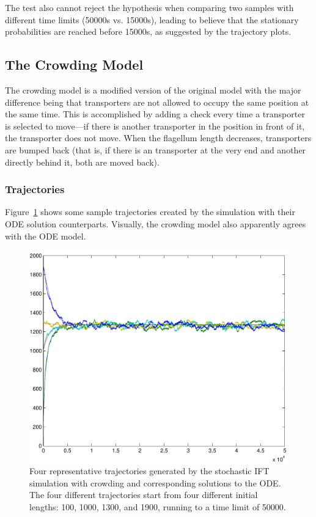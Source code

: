 \documentclass[titlepage]{article}
\begin{document}
The test also cannot reject the hypothesis when comparing two samples with different time limits (50000s vs. 15000s), leading to believe that the stationary probabilities are reached before 15000s, as suggested by the trajectory plots.


\subsection{The Crowding Model}
The crowding model is a modified version of the original model with the major difference being that transporters are not allowed to occupy the same position at the same time. This is accomplished by adding a check every time a transporter is selected to move---if there is another transporter in the position in front of it, the transporter does not move. When the flagellum length decreases, transporters are bumped back (that is, if there is an transporter at the very end and another directly behind it, both are moved back).

\subsubsection{Trajectories}
Figure~\ref{fig:crowdTrajs} shows some sample trajectories created by the simulation with their ODE solution counterparts. Visually, the crowding model also apparently agrees with the ODE model.

\begin{figure}%
\centering
\includegraphics[width=\textwidth]{CrowdingModelTrajs}
\caption{
Four representative trajectories generated by the stochastic IFT simulation with crowding and corresponding solutions to the ODE.
The four different trajectories start from four different initial lengths: 100, 1000, 1300, and 1900, running to a time limit of 50000.
}
\label{fig:crowdTrajs}
\end{figure}
\end{document}
